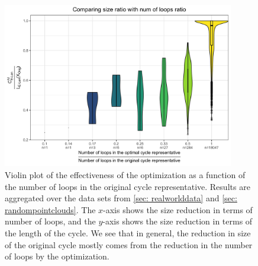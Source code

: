 \begin{figure}
    \centering
    \includegraphics[width=0.9\textwidth]{figures/sizeratio_loopratio.jpg}
    \caption{Violin plot of the effectiveness of the optimization as a function of the number of loops in the original cycle representative.  Results are aggregated over the data sets from \se \ref{sec: realworlddata} and \ref{sec: randompointclouds}. The $x$-axis shows the size reduction in terms of number of loops, and the $y$-axis shows the size reduction in terms of the length of the cycle. We see that in general, the reduction in size of the original cycle mostly comes from the reduction in the number of loops by the optimization. } 
    \label{fig:reductioncompare}
\end{figure}

